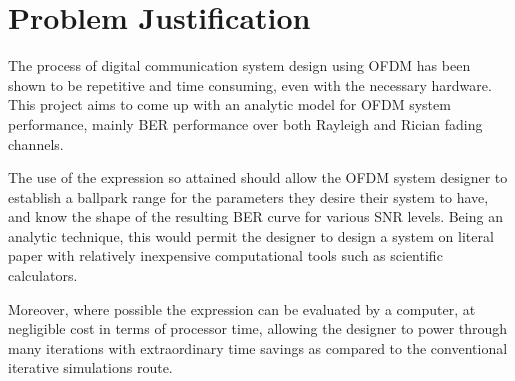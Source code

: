 
\section{Problem Justification}
The process of digital communication system design using \gls{OFDM} has been shown to be repetitive and time consuming, even with the necessary hardware. This project aims to come up with an analytic model for \gls{OFDM} system performance, mainly \gls{BER} performance over both Rayleigh and Rician fading channels.

The use of the expression so attained should allow the \gls{OFDM} system designer to establish a ballpark range for the parameters they desire their system to have, and know the shape of the resulting \gls{BER} curve for various \gls{SNR} levels. Being an analytic technique, this would permit the designer to design a system on literal paper with relatively inexpensive computational tools such as scientific calculators.

Moreover, where possible the expression can be evaluated by a computer, at negligible cost in terms of processor time, allowing the designer to power through many iterations with extraordinary time savings as compared to the conventional iterative simulations route.
